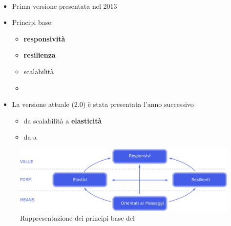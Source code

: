         \begin{frame}{\insertsectionhead}
            \begin{block}{\insertsubsectionhead~\cite{citeulike:13845446}}
                \begin{itemize}
                    \item
                        Prima versione presentata nel 2013
                    \item
                        Principi base:
                        \begin{itemize}
                            \item \textbf{responsività}
                            \item \textbf{resilienza}
                            \item scalabilità
                            \item {}
                        \end{itemize}
                    \item
                        La versione attuale (2.0) è stata presentata l'anno successivo\footnotemark
                        \begin{itemize}
                            \item da scalabilità a \textbf{elasticità}
                            \item da  a \textbf{}
                        \end{itemize}
                \end{itemize}
            \end{block}
        \end{frame}

        \begin{frame}[c]{\insertsectionhead}{\insertsubsectionhead}
            \begin{figure}[htbp]
                \centering
                \includegraphics[width=\linewidth]{reactive-traits-it}
                \caption{Rappresentazione dei principi base del }
                \label{fig:manifest}
            \end{figure}
        \end{frame}

